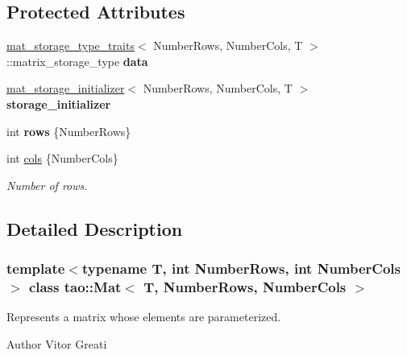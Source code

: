 \subsection*{Protected Attributes}
\begin{DoxyCompactItemize}
\item 
\mbox{\label{classtao_1_1_mat_a75755f968e77a5153cdf6c4cf2e913f2}} 
\mbox{\hyperlink{structtao_1_1mat__storage__type__traits}{mat\+\_\+storage\+\_\+type\+\_\+traits}}$<$ Number\+Rows, Number\+Cols, T $>$\+::matrix\+\_\+storage\+\_\+type {\bfseries data}
\item 
\mbox{\label{classtao_1_1_mat_aee1b5ed6616059fb81925ad7d8145840}} 
\mbox{\hyperlink{structtao_1_1mat__storage__initializer}{mat\+\_\+storage\+\_\+initializer}}$<$ Number\+Rows, Number\+Cols, T $>$ {\bfseries storage\+\_\+initializer}
\item 
\mbox{\label{classtao_1_1_mat_a25f6ae54fdd89d4aa7ed5e019a16b087}} 
int {\bfseries rows} \{Number\+Rows\}
\item 
\mbox{\label{classtao_1_1_mat_aa9d8f0eac7b7e8e9183e6f8cb8908ef5}} 
int \mbox{\hyperlink{classtao_1_1_mat_aa9d8f0eac7b7e8e9183e6f8cb8908ef5}{cols}} \{Number\+Cols\}
\begin{DoxyCompactList}\small\item\em Number of rows. \end{DoxyCompactList}\end{DoxyCompactItemize}


\subsection{Detailed Description}
\subsubsection*{template$<$typename T, int Number\+Rows, int Number\+Cols$>$\newline
class tao\+::\+Mat$<$ T, Number\+Rows, Number\+Cols $>$}

Represents a matrix whose elements are parameterized. 

\begin{DoxyAuthor}{Author}
Vitor Greati 
\end{DoxyAuthor}


